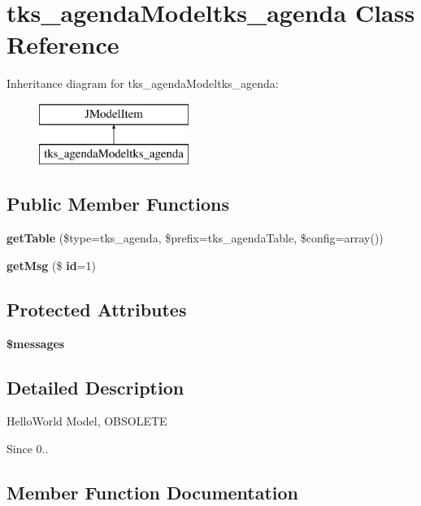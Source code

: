 \section{tks\+\_\+agenda\+Modeltks\+\_\+agenda Class Reference}
\label{classtks__agenda_modeltks__agenda}
Inheritance diagram for tks\+\_\+agenda\+Modeltks\+\_\+agenda\+:\begin{figure}[H]
\begin{center}
\leavevmode
\includegraphics[height=2.000000cm]{classtks__agenda_modeltks__agenda}
\end{center}
\end{figure}
\subsection*{Public Member Functions}
\begin{DoxyCompactItemize}
\item 
\textbf{ get\+Table} (\$type=\textquotesingle{}tks\+\_\+agenda\textquotesingle{}, \$prefix=\textquotesingle{}tks\+\_\+agenda\+Table\textquotesingle{}, \$config=array())
\item 
\textbf{ get\+Msg} (\$\textbf{ id}=1)
\end{DoxyCompactItemize}
\subsection*{Protected Attributes}
\begin{DoxyCompactItemize}
\item 
\textbf{ \$messages}
\end{DoxyCompactItemize}


\subsection{Detailed Description}
Hello\+World Model, O\+B\+S\+O\+L\+E\+TE

\begin{DoxySince}{Since}
0.. 
\end{DoxySince}


\subsection{Member Function Documentation}
\mbox{\label{classtks__agenda_modeltks__agenda_ab6f99e9d7255a96eca0220641a2ccbc1}} 
